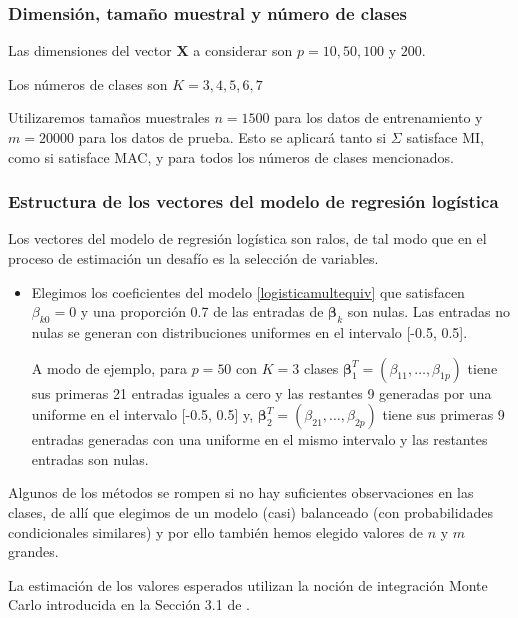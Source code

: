 \documentclass{report}
\begin{document}
\subsubsection*{Dimensión, tamaño muestral y número de clases}


Las dimensiones del vector $\mathbf{X}$ a considerar son $p=10, 50, 100$ y  $200$.  

Los números de clases son $K= 3,4,5,6,7$

Utilizaremos tamaños muestrales $n=1500$ para los datos de entrenamiento y $m=20000$ para los datos de prueba. Esto se aplicará tanto si $\Sigma$ satisface MI, como si satisface MAC, y para todos los números de clases mencionados.



\subsubsection*{Estructura de los vectores del modelo de regresión logística }



Los vectores del modelo de regresión logística son ralos, de tal modo que en el proceso de estimación un desafío es la   selección de variables.





\begin{itemize}
	\item Elegimos los coeficientes del modelo \eqref{logisticamultequiv} que satisfacen $\beta_{k0}=0$ y   una proporción 0.7 de las entradas de $\boldsymbol{\beta}_k$ son nulas.   Las entradas no nulas se generan con distribuciones uniformes en el intervalo [-0.5, 0.5]. 
	
	A modo de ejemplo, para $p=50$ con $K=3$ clases  $\boldsymbol{\beta}_1^T = (\beta_{11}, \ldots, \beta_{1p})$ tiene sus primeras 21 entradas iguales a cero y las restantes 9 generadas por una uniforme en el intervalo [-0.5, 0.5] y, $\boldsymbol{\beta}_2^T = (\beta_{21}, \ldots, \beta_{2p})$ tiene sus primeras 9 entradas generadas con una  uniforme en el mismo intervalo y las restantes entradas son nulas.  
\end{itemize}


Algunos de los métodos se rompen si no hay suficientes observaciones en las
clases, de allí que elegimos de  un modelo (casi) balanceado (con probabilidades
condicionales similares) y por ello también hemos elegido valores de  $n$ y $m$ grandes. 

La estimación de los valores esperados utilizan la noción de integración Monte Carlo introducida en la Sección 3.1 de \cite{casella2010}. 
\end{document}
